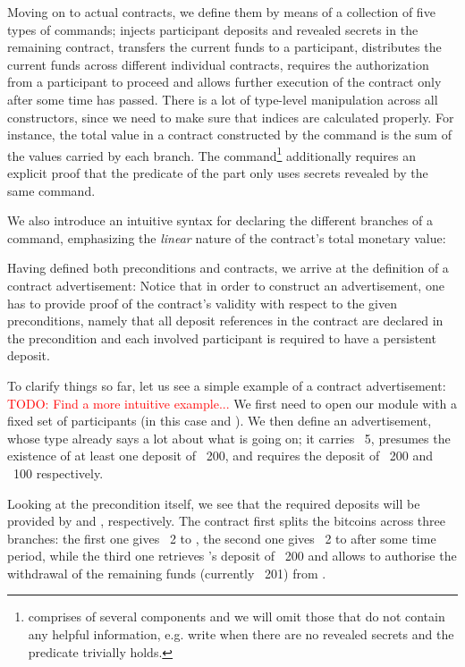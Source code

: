 \documentclass[acmsmall,nonacm=true,screen=true]{acmart}
\newcommand\todo[1]{\textcolor{red}{TODO: #1}}
\begin{document}
Moving on to actual contracts, we define them by means of a collection of five types of commands;
\inlinePut{} injects participant deposits and revealed secrets in the remaining contract,
\inlineWithdraw{} transfers the current funds to a participant,
\inlineSplit{} distributes the current funds across different individual contracts,
\inlineAuthDecoration{} requires the authorization from a participant to proceed
and \inlineTimeDecoration{} allows further execution of the contract only after some time has passed.
\BITcontracts{}
There is a lot of type-level manipulation across all constructors, since we need to make sure that indices are
calculated properly. For instance, the total value in a contract constructed by the \inlineSplit{} command is the 
sum of the values carried by each branch.
The \inlinePut{} command\footnote{
\inlinePut{} comprises of several components and we will omit those that do not contain any helpful information,
e.g. write \inlineSimplePut{} when there are no revealed secrets and the predicate trivially holds.
} additionally requires an explicit proof that the predicate
of the \inlineIf{} part only uses secrets revealed by the same command.

We also introduce an intuitive syntax for declaring the different branches of a \inlineSplit{} command, emphasizing the
\textit{linear} nature of the contract's total monetary value:
\BITlollipop{}

Having defined both preconditions and contracts, we arrive at the definition of a contract advertisement:
\BITadvertisements{}
Notice that in order to construct an advertisement, one has to provide proof of the contract's validity with respect to
the given preconditions, namely that all deposit references in the contract are declared in the precondition
and each involved participant is required to have a persistent deposit.

To clarify things so far, let us see a simple example of a contract advertisement:
\\ \todo{Find a more intuitive example...}
\BITexampleAdvertisement{}
We first need to open our module with a fixed set of participants (in this case \inlineA{} and \inlineB{}).
We then define an advertisement, whose type already says a lot about what is going on;
it carries \bitcoin ~5, presumes the existence of at least one deposit of \bitcoin ~200, and requires the deposit
of \bitcoin ~200 and \bitcoin ~100 respectively.

Looking at the precondition itself, we see that the required deposits will be provided by \inlineB{} and \inlineA{}, respectively.
The contract first splits the bitcoins across three branches:
the first one gives \bitcoin ~2 to \inlineB{}, the second one gives \bitcoin ~2 to \inlineA{} after some time period,
while the third one retrieves \inlineB{}'s deposit of \bitcoin ~200 and allows \inlineB{} to authorise the
withdrawal of the remaining funds (currently \bitcoin ~201) from \inlineA{}.
\end{document}
